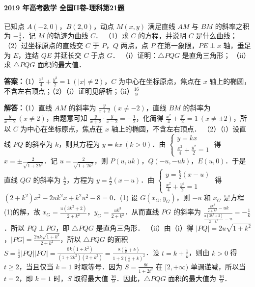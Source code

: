 \documentclass[UTF8,a4paper,11pt]{ctexart}
\begin{document}
\paragraph{2019 年高考数学 全国II卷-理科第21题}

已知点 $A(-2,0)$，$B(2,0)$，动点 $M(x,y)$ 满足直线 $AM$ 与 $BM$ 的斜率之积为 $-\frac{1}{2}$．记 $M$ 的轨迹为曲线 $C$．
（1）求 $C$ 的方程，并说明 $C$ 是什么曲线；
（2）过坐标原点的直线交 $C$ 于 $P$，$Q$ 两点，点 $P$ 在第一象限，$PE\perp x$ 轴，垂足为 $E$，连结 $QE$ 并延长交 $C$ 于点 $G$．
     （i）证明：$\triangle PQG$ 是直角三角形；
     （ii）求 $\triangle PQG$ 面积的最大值．

\textbf{答案：}（1）$\frac{x^2}{4}+\frac{y^2}{2}=1\ (|x|\neq 2)$，$C$ 为中心在坐标原点，焦点在 $x$ 轴上的椭圆，不含左右顶点；（2）（i）证明见解析；（ii）$\frac{16}{9}$\par

\textbf{解答：}（1）直线 $AM$ 的斜率为 $\frac{y}{x+2}\ (x\neq -2)$，直线 $BM$ 的斜率为 $\frac{y}{x-2}\ (x\neq 2)$，由题意可知 $\frac{y}{x+2}\cdot\frac{y}{x-2}=-\frac{1}{2}$，化简得 $\frac{x^2}{4}+\frac{y^2}{2}=1\ (x\neq\pm 2)$，所以 $C$ 为中心在坐标原点，焦点在 $x$ 轴上的椭圆，不含左右顶点．
（2）（i）设直线 $PQ$ 的斜率为 $k$，则其方程为 $y=kx\ (k>0)$．由 $\begin{cases} y=kx \\ \frac{x^2}{4}+\frac{y^2}{2}=1 \end{cases}$ 得 $x=\pm\frac{2}{\sqrt{1+2k^2}}$．记 $u=\frac{2}{\sqrt{1+2k^2}}$，则 $P(u,uk)$，$Q(-u,-uk)$，$E(u,0)$．于是直线 $QG$ 的斜率为 $\frac{k}{2}$，方程为 $y=\frac{k}{2}(x-u)$．由 $\begin{cases} y=\frac{k}{2}(x-u) \\ \frac{x^2}{4}+\frac{y^2}{2}=1 \end{cases}$ 得 $(2+k^2)x^2-2uk^2x+k^2u^2-8=0$．(1) 设 $G(x_G,y_G)$，则 $-u$ 和 $x_G$ 是方程(1)的解，故 $x_G=\frac{u(3k^2+2)}{2+k^2}$，$y_G=\frac{uk^3}{2+k^2}$．从而直线 $PG$ 的斜率为 $\frac{\frac{uk^3}{2+k^2}-uk}{\frac{u(3k^2+2)}{2+k^2}-u}=-\frac{1}{k}$．所以 $PQ\perp PG$，即 $\triangle PQG$ 是直角三角形．
（ii）由（i）得 $|PQ|=2u\sqrt{1+k^2}$，$|PG|=\frac{2uk\sqrt{1+k^2}}{2+k^2}$，所以 $\triangle PQG$ 的面积 $S=\frac{1}{2}|PQ||PG|=\frac{8k(1+k^2)}{(1+2k^2)(2+k^2)}=\frac{8(\frac{1}{k}+k)}{1+2(\frac{1}{k}+k)^2}$．设 $t=k+\frac{1}{k}$，则由 $k>0$ 得 $t\geq 2$，当且仅当 $k=1$ 时取等号．因为 $S=\frac{8t}{1+2t^2}$ 在 $[2,+\infty)$ 单调递减，所以当 $t=2$，即 $k=1$ 时，$S$ 取得最大值 $\frac{16}{9}$．因此，$\triangle PQG$ 面积的最大值为 $\frac{16}{9}$．
\end{document}

